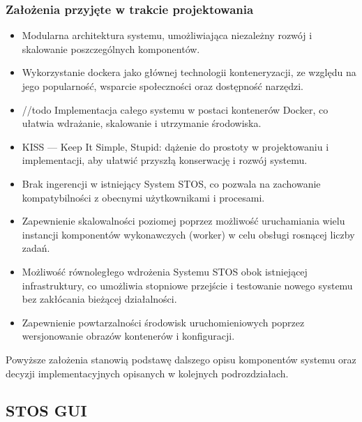 \documentclass[12pt,a4paper]{article}
\begin{document}
\subsubsection*{Założenia przyjęte w trakcie projektowania}
\begin{itemize}
    \item Modularna architektura systemu, umożliwiająca niezależny rozwój i skalowanie poszczególnych komponentów.
    \item Wykorzystanie dockera jako głównej technologii konteneryzacji, ze względu na jego popularność, wsparcie społeczności oraz dostępność narzędzi.
    \item //todo Implementacja całego systemu w postaci kontenerów Docker, co ułatwia wdrażanie, skalowanie i utrzymanie środowiska.
    \item KISS --- Keep It Simple, Stupid: dążenie do prostoty w projektowaniu i implementacji, aby ułatwić przyszłą konserwację i rozwój systemu.
    \item Brak ingerencji w istniejący System STOS, co pozwala na zachowanie kompatybilności z obecnymi użytkownikami i procesami.
    \item Zapewnienie skalowalności poziomej poprzez możliwość uruchamiania wielu instancji komponentów wykonawczych (worker) w celu obsługi rosnącej liczby zadań.
    \item Możliwość równoległego wdrożenia Systemu STOS obok istniejącej infrastruktury, co umożliwia stopniowe przejście i testowanie nowego systemu bez zakłócania bieżącej działalności.
    \item Zapewnienie powtarzalności środowisk uruchomieniowych poprzez wersjonowanie obrazów kontenerów i konfiguracji.

\end{itemize}

Powyższe założenia stanowią podstawę dalszego opisu komponentów systemu oraz decyzji implementacyjnych opisanych w kolejnych podrozdziałach.
























\newpage
\subsection{STOS GUI}
\end{document}
